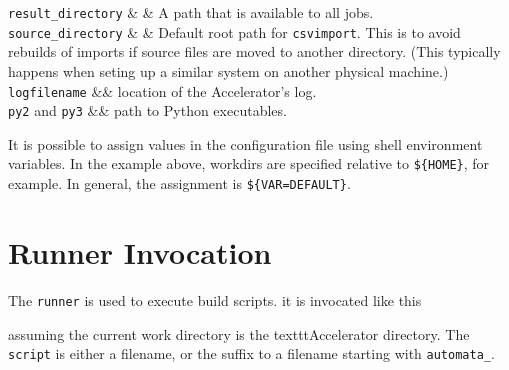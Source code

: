 \RP \texttt{result\_directory} & & A path that is available to all
jobs.    \\

\RP \texttt{source\_directory} & & Default root path for
\texttt{csvimport}.  This is to avoid rebuilds of imports if source
files are moved to another directory.  (This typically happens when
seting up a similar system on another physical machine.)\\

\RP \texttt{logfilename} && location of the Accelerator's log.\\

\RP \texttt{py2} and \texttt{py3} && path to Python executables.
\\

\stoptable
{}

It is possible to assign values in the configuration file using shell
environment variables.  In the example above, workdirs are specified
relative to \texttt{\$\{HOME\}}, for example.  In general, the
assignment is \texttt{\$\{VAR=DEFAULT\}}.


\clearpage
\section{Runner Invocation}
The \texttt{runner} is used to execute build scripts.  it is invocated
like this
\begin{shell}
\end{shell}
assuming the current work directory is the texttt{Accelerator}
directory.  The \texttt{script} is either a filename, or the suffix to
a filename starting with \texttt{automata\_}.

